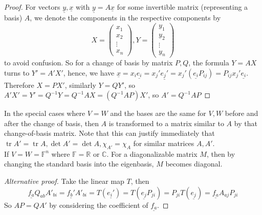 \begin{proof}
    For vectors $\underline{y},\underline{x}$ with $\underline{y}=A\underline{x}$ for some invertible matrix (representing a basis) $A$, we denote the components in the respective components by
    $$X=\begin{pmatrix}
        x_1\\
        x_2\\
        \vdots\\
        x_n
    \end{pmatrix},Y=\begin{pmatrix}
        y_1\\
        y_2\\
        \vdots\\
        y_n
    \end{pmatrix}$$
    to avoid confusion.
    So for a change of basis by matrix $P,Q$, the formula $Y=AX$ turns to $Y'=A'X'$, hence, we have $\underline{x}=x_i\underline{e_i}=x_j'\underline{e_j'}=x_j'(\underline{e_i}P_{ij})=P_{ij}x_j'\underline{e_i}$.
    Therefore $X=PX'$, similarly $Y=QY'$, so $A'X'=Y'=Q^{-1}Y=Q^{-1}AX=(Q^{-1}AP)X'$, so $A'=Q^{-1}AP$
\end{proof}
In the special cases where $V=W$ and the bases are the same for $V,W$ before and after the change of basis, then $A$ is transformed to a matrix similar to $A$ by that change-of-basis matrix.
Note that this can justify immediately that $\operatorname{tr}A'=\operatorname{tr}A,\det A'=\det A,\chi_{A'}=\chi_A$ for similar matrices $A,A'$.\\
If $V=W=\mathbb F^n$ where $\mathbb F=\mathbb R$ or $\mathbb C$.
For a diagonalizable matrix $M$, then by changing the standard basis into the eigenbasis, $M$ becomes diagonal.
\begin{proof}[Alternative proof]
    Take the linear map $T$, then
    $$\underline{f_a}Q_{ab}A'_{bi}=\underline{f_b'}A'_{bi}=T(\underline{e_i'})=T(\underline{e_j}P_{ji})=P_{ji}T(\underline{e_j})=\underline{f_a}A_{aj}P_{ji}$$
    So $AP=QA'$ by considering the coefficient of $\underline{f_a}$.
\end{proof}
